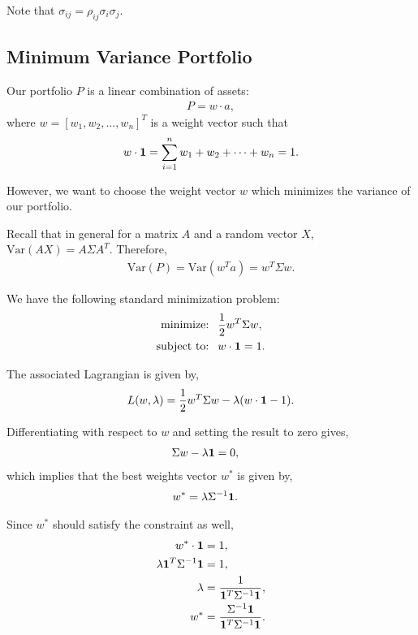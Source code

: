 \documentclass{amsart}
\theoremstyle{plain}
\numberwithin{equation}{section}
\begin{document}
Note that $\sigma_{ij} = \rho_{ij} \sigma_i \sigma_j$.

\subsection*{Minimum Variance Portfolio}
Our portfolio $P$ is a linear combination of 
assets:
\begin{align*}
P = w \cdot a,
\end{align*}
where $w = [w_1, w_2, \ldots, w_n]^T$ is a weight 
vector such that \
\begin{align*}
w \cdot {\bf 1} = \sum_{i=1}^{n} w_1 + w_2 + \cdots + w_n = 1.
\end{align*}

However, we want to choose the weight vector 
$w$ which minimizes the variance of our 
portfolio.

Recall that in general for a matrix $A$ and a random vector $X$, 
$\mathrm{Var}(AX) = A\Sigma A^T$.
Therefore,
\begin{align*}
\mathrm{Var}(P) = \mathrm{Var}(w^T a) = w^T\Sigma w.
\end{align*}

We have the following standard minimization problem:
\begin{align*}
\textrm{minimize: }   ~ & \frac{1}{2} w^T\Sigma w,\\
\textrm{subject to: } ~ & w \cdot {\bf 1} = 1.
\end{align*}

The associated Lagrangian is given by,
\begin{align*}
L(w, \lambda) = \frac{1}{2} w^T\Sigma w - \lambda ( w \cdot {\bf 1} - 1 ).
\end{align*}

Differentiating with respect to $w$ and setting the result to zero gives,
\begin{align*}
\Sigma w - \lambda {\bf 1} & = 0,
\end{align*}
which implies that the best weights vector
$w^*$ is given by,
\begin{align*}
w^* &= \lambda \Sigma^{-1} {\bf 1}.
\end{align*}

Since $w^*$ should satisfy the constraint as well,
\begin{align*}
w^* \cdot {\bf 1} &= 1,\\
\lambda {\bf 1}^T \Sigma^{-1} {\bf 1} &= 1,\\
\lambda &=\frac{1}{{\bf 1}^T \Sigma^{-1} {\bf 1}},\\
w^* &=\frac{\Sigma^{-1} {\bf 1}}{{\bf 1}^T \Sigma^{-1} {\bf 1}}.
\end{align*}
\end{document}
